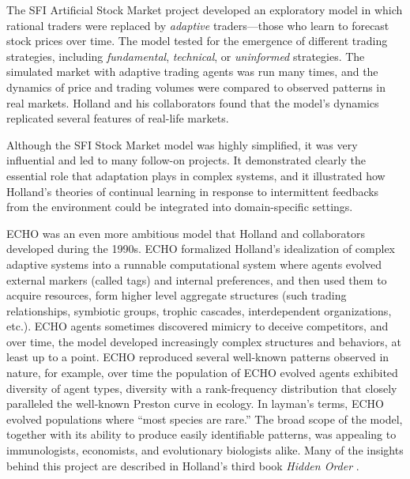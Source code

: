 \documentclass{sig-alternate}
\begin{document}
The SFI Artificial Stock Market project \cite{Arthur1997,Palmer1994}
developed an exploratory model in which rational
traders were replaced by \emph{adaptive} traders---those who learn to
forecast stock prices over time.  The model tested for the
emergence of different trading strategies, including
\emph{fundamental}, \emph{technical}, or \emph{uninformed}
strategies. The simulated market with adaptive trading agents was run
many times, and the dynamics of price and trading volumes were
compared to observed patterns in real markets.  Holland and his
collaborators found that the model's dynamics replicated several
features of real-life markets.

Although the SFI Stock Market model was highly simplified, it was very
influential and led to many follow-on projects.  It 
demonstrated clearly the essential role that adaptation plays in complex
systems, and it illustrated how Holland's theories of continual learning
in response to intermittent feedbacks from the environment could be
integrated into domain-specific settings.

ECHO \cite{Holland1999,Hraber1997} was an even more ambitious model
that Holland and collaborators developed during the 1990s. 
ECHO formalized Holland's idealization of complex adaptive systems into
a runnable computational system where agents evolved external markers
(called tags) and internal preferences, and then used them to acquire
resources, form higher
level aggregate structures (such trading relationships, symbiotic groups,
trophic cascades, interdependent organizations, etc.).  ECHO agents
sometimes discovered mimicry to deceive competitors, and over time,
the model developed increasingly complex structures and behaviors, at
least up to a point.  ECHO reproduced several well-known patterns 
observed in nature, for example, over time the population of ECHO
evolved agents exhibited diversity of agent types, diversity with a 
rank-frequency distribution that
closely paralleled the well-known Preston curve in ecology.  In
layman's terms, ECHO evolved populations where 
``most species are rare.''  
The broad scope of the model, together with its ability to produce
easily identifiable patterns, was appealing to immunologists, economists, and evolutionary biologists alike.   Many
of the insights behind this project are described in Holland's third book \emph{Hidden Order} \cite{Holland1995}. 
\end{document}
